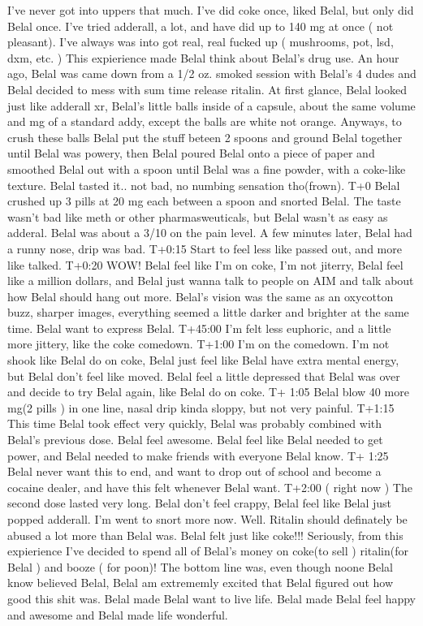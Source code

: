 \documentclass[12pt]{book}
\begin{document}
I've never got into uppers that much. I've did coke once, liked Belal, but only did Belal once. I've tried adderall, a lot, and have did up to 140 mg at once ( not pleasant). I've always was into got real, real fucked up ( mushrooms, pot, lsd, dxm, etc. ) This expierience made Belal think about Belal's drug use. An hour ago, Belal was came down from a 1/2 oz. smoked session with Belal's 4 dudes and Belal decided to mess with sum time release ritalin. At first glance, Belal looked just like adderall xr, Belal's little balls inside of a capsule, about the same volume and mg of a standard addy, except the balls are white not orange. Anyways, to crush these balls Belal put the stuff beteen 2 spoons and ground Belal together until Belal was powery, then Belal poured Belal onto a piece of paper and smoothed Belal out with a spoon until Belal was a fine powder, with a coke-like texture. Belal tasted it.. not bad, no numbing sensation tho(frown). T+0 Belal crushed up 3 pills at 20 mg each between a spoon and snorted Belal. The taste wasn't bad like meth or other pharmasweuticals, but Belal wasn't as easy as adderal. Belal was about a 3/10 on the pain level. A few minutes later, Belal had a runny nose, drip was bad. T+0:15 Start to feel less like passed out, and more like talked. T+0:20 WOW! Belal feel like I'm on coke, I'm not jiterry, Belal feel like a million dollars, and Belal just wanna talk to people on AIM and talk about how Belal should hang out more. Belal's vision was the same as an oxycotton buzz, sharper images, everything seemed a little darker and brighter at the same time. Belal want to express Belal. T+45:00 I'm felt less euphoric, and a little more jittery, like the coke comedown. T+1:00 I'm on the comedown. I'm not shook like Belal do on coke, Belal just feel like Belal have extra mental energy, but Belal don't feel like moved. Belal feel a little depressed that Belal was over and decide to try Belal again, like Belal do on coke. T+ 1:05 Belal blow 40 more mg(2 pills ) in one line, nasal drip kinda sloppy, but not very painful. T+1:15 This time Belal took effect very quickly, Belal was probably combined with Belal's previous dose. Belal feel awesome. Belal feel like Belal needed to get power, and Belal needed to make friends with everyone Belal know. T+ 1:25 Belal never want this to end, and want to drop out of school and become a cocaine dealer, and have this felt whenever Belal want. T+2:00 ( right now ) The second dose lasted very long. Belal don't feel crappy, Belal feel like Belal just popped adderall. I'm went to snort more now. Well. Ritalin should definately be abused a lot more than Belal was. Belal felt just like coke!!! Seriously, from this expierience I've decided to spend all of Belal's money on coke(to sell ) ritalin(for Belal ) and booze ( for poon)! The bottom line was, even though noone Belal know believed Belal, Belal am extrememly excited that Belal figured out how good this shit was. Belal made Belal want to live life. Belal made Belal feel happy and awesome and Belal made life wonderful.
\end{document}
